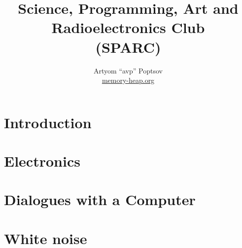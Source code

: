 \documentclass[a4paper,twoside]{book}
\title{Science, Programming, Art and Radioelectronics Club\\(SPARC)}
\author{Artyom ``avp'' Poptsov\\\href{https://memory-heap.org}{memory-heap.org}}
\begin{document}
\maketitle

\tableofcontents

\chapter*{Introduction}




\chapter{Electronics}
\label{chapter:electronics}








\chapter{Dialogues with a Computer}
\label{chapter:dialogues-with-computer}








\newpage






\chapter{White noise}
\label{chapter:white-noise}
\end{document}

